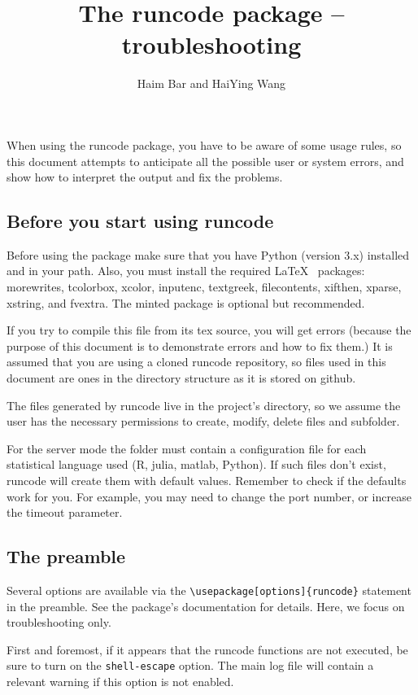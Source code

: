 \documentclass[a4paper,10pt]{article}
\title{The runcode package -- troubleshooting}
\author{Haim Bar and HaiYing Wang}
\begin{document}
\maketitle

When using the runcode package, you have to be aware of some usage rules, so this document attempts to anticipate all the possible user or system errors, and show how to interpret the output and fix the problems.

\subsection*{Before you start using runcode}

Before using the package make sure that you have Python (version 3.x) installed and in your path. Also, you must install the required \LaTeX~ packages: 
morewrites, tcolorbox, xcolor, inputenc, textgreek, filecontents, xifthen, xparse, xstring, and fvextra. The minted package is optional but recommended.

If you try to compile this file from its tex source, you will get errors (because the purpose of this document is to demonstrate errors and how to fix them.) It is assumed that you are using a cloned runcode repository, so files used in this document are ones in the directory structure as it is stored on github.

The files generated by runcode live in the project's directory, so we assume the user has the necessary permissions to create, modify, delete files and subfolder.

For the server mode the folder must contain a configuration file for each statistical language used (R, julia, matlab, Python). If such files don't exist, runcode will create them with default values. Remember to check if the defaults work for you. For example, you may need to change the port number, or increase the timeout parameter.


\subsection*{The preamble}
Several options are available via the \verb|\usepackage[options]{runcode}| statement in the preamble. See the package's documentation for details. Here, we focus on troubleshooting only.

First and foremost, if it appears that the runcode functions are not executed, be sure to turn on the \verb|shell-escape| option. The main log file will contain a relevant warning if this option is not enabled.
\end{document}
